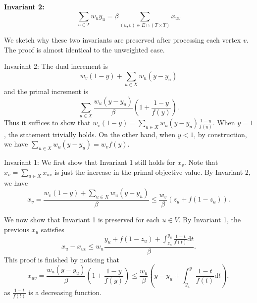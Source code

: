 \textbf{Invariant 2:} $$\sum_{u\in T} w_uy_{u}=\beta\sum_{(u,v)\in E\cap (T\times T)} x_{uv}$$

We sketch why these two invariants are preserved after processing each vertex $v$. The proof is almost identical to the unweighted case.

Invariant 2: The dual increment is $$w_v(1-y)+\sum_{u\in X}w_u(y-y_u)$$ and the primal increment is $$\sum_{u\in X} \frac{w_u(y-y_u)}{\beta}\left( 1 + \frac{1-y}{f(y)}\right).$$
Thus it suffices to show that $w_v(1-y)=\sum_{u\in X}w_u(y-y_u)\frac{1-y}{f(y)}$. 
When $y=1$, the statement trivially holds. On the other hand, when $y<1$, by construction, we have
$\sum_{u\in X}w_u(y-y_u)=w_vf(y)$.

Invariant 1: We first show that Invariant 1 still holds for $x_v$. Note that $x_v=\sum_{u\in X}x_{uv}$ is just the increase in the primal objective value. By Invariant 2, we have
$$x_v=\frac{w_v(1-y)+\sum_{u\in X}w_u(y-y_u)}{\beta}\le \frac{w_v}{\beta}(z_u + f(1-z_u)).$$

We now show that Invariant 1 is preserved for each $u\in V$. By Invariant 1, the previous $x_u$ satisfies $$x_u-x_{uv}\leq w_u\frac{y_{u}+f(1-z_u)+\int_{z_u}^{y_{u}}\frac{1-t}{f(t)}\mathrm{d}t}{\beta}.$$
This proof is finished by noticing that $$x_{uv}=\frac{w_u(y-y_u)}{\beta}\left( 1 + \frac{1-y}{f(y)}\right)\leq  \frac{w_u}{\beta} \left( y-y_u+ \int_{y_u}^y \frac{1-t}{f(t)}
\mathrm{d}t\right),$$ as $\frac{1-t}{f(t)}$ is a decreasing function.

